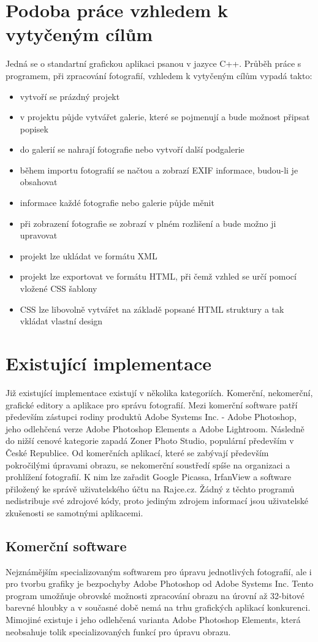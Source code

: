 \documentclass[11pt,twoside,a4paper]{book}
\begin{document}
\section{Podoba práce vzhledem k vytyčeným cílům}
\noindent
Jedná se o standartní grafickou aplikaci psanou v jazyce C++. Průběh práce s programem, při zpracování fotografií, vzhledem k vytyčeným cílům vypadá takto:
\begin{itemize}
\item vytvoří se prázdný projekt
\item v projektu půjde vytvářet galerie, které se pojmenují a bude možnost připsat popisek
\item do galerií se nahrají fotografie nebo vytvoří další podgalerie
\item během importu fotografií se načtou a zobrazí EXIF informace, budou-li je obsahovat
\item informace každé fotografie nebo galerie půjde měnit
\item při zobrazení fotografie se zobrazí v plném rozlišení a bude možno ji upravovat
\item projekt lze ukládat ve formátu XML
\item projekt lze exportovat ve formátu HTML, při čemž vzhled se určí pomocí vložené CSS šablony
\item CSS lze libovolně vytvářet na základě popsané HTML struktury a tak vkládat vlastní design
\end{itemize}

\section{Existující implementace}
\noindent
Již existující implementace existují v několika kategoriích. Komerční, nekomerční, grafické editory a aplikace pro správu fotografií. Mezi komerční software patří především zástupci rodiny produktů Adobe Systems Inc. - Adobe Photoshop, jeho odlehčená verze Adobe Photoshop Elements a Adobe Lightroom. Následně do nižší cenové kategorie zapadá Zoner Photo Studio, populární především v České Republice. Od komerčních aplikací, které se zabývají především pokročilými úpravami obrazu, se nekomerční soustředí spíše na organizaci a prohlížení fotografií. K nim lze zařadit Google Picassa, IrfanView a software přiložený ke správě uživatelského účtu na Rajce.cz. Žádný z těchto programů nedistribuje své zdrojové kódy, proto jediným zdrojem informací jsou uživatelské zkušenosti se samotnými aplikacemi.

\subsection{Komerční software}
\noindent
Nejznámějším specializovaným softwarem pro úpravu jednotlivých fotografií, ale i pro tvorbu grafiky je bezpochyby Adobe Photoshop od Adobe Systems Inc. Tento program umožňuje obrovské možnosti zpracování obrazu na úrovní až 32-bitové barevné hloubky a v současné době nemá na trhu grafických aplikací konkurenci. Mimojiné existuje i jeho odlehčená varianta Adobe Photoshop Elements, která neobsahuje tolik specializovaných funkcí pro úpravu obrazu. 
\end{document}
